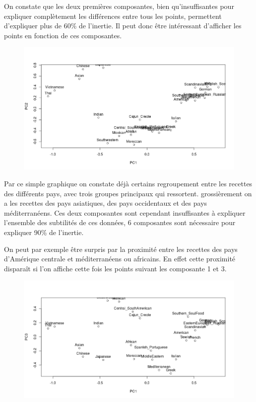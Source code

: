 \documentclass[a4paper, titlepage]{report}
\begin{document}
On constate que les deux premières composantes, bien qu'insuffisantes pour expliquer complètement les différences entre tous les points, permettent d'expliquer plus de 60\% de l'inertie. Il peut donc être intéressant d'afficher les points en fonction de ces composantes.
\begin{figure}[h]
	\begin{center}
		\includegraphics[scale = 0.32]{./doc/plot-recettes-composantes-1-2.png}
	\end{center}
\end{figure}

Par ce simple graphique on constate déjà certains regroupement entre les recettes des différents pays, avec trois groupes principaux qui ressortent. grossièrement on a les recettes des pays asiatiques, des pays occidentaux et des pays méditerranéens. Ces deux composantes sont cependant insuffisantes à expliquer l'ensemble des subtilités de ces données, 6 composantes sont nécessaire pour expliquer 90\% de l'inertie.

On peut par exemple être surpris par la proximité entre les recettes des pays d’Amérique centrale et méditerranéens ou africains. En effet cette proximité disparaît si l'on affiche cette fois les points suivant les composante 1 et 3.
\begin{figure}[h]
	\begin{center}
		\includegraphics[scale = 0.32]{./doc/plot-recettes-composantes-1-3.png}
	\end{center}
\end{figure}
\end{document}
